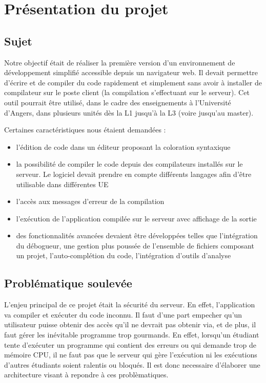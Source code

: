 \chapter{Présentation du projet}

\section{Sujet}

\par Notre objectif était de réaliser la première version d'un environnement de développement simplifié accessible depuis un navigateur web. Il devait permettre d'écrire et de compiler du code rapidement et simplement sans avoir à installer de compilateur sur le poste client (la compilation s'effectuant sur le serveur). Cet outil pourrait être utilisé, dans le cadre des enseignements à l'Université d'Angers, dans plusieurs unités dès la L1 jusqu'à la L3 (voire jusqu'au master). \\

\par Certaines caractéristiques nous étaient demandées :

\begin{itemize}

	\item l'édition de code dans un éditeur proposant la coloration syntaxique
	\item la possibilité de compiler le code depuis des compilateurs installés sur le serveur. Le logiciel devait prendre en compte différents langages afin d’être utilisable dans différentes UE
	\item l'accès aux messages d'erreur de la compilation
	\item l'exécution de l'application compilée sur le serveur avec affichage de la sortie
	\item des fonctionnalités avancées devaient être développées telles que l’intégration du débogueur, une gestion plus poussée de l’ensemble de fichiers composant un projet, l'auto-complétion du code, l'intégration d’outils d’analyse

\end{itemize}


\section{Problématique soulevée}

\par L'enjeu principal de ce projet était la sécurité du serveur. En effet, l'application va compiler et exécuter du code inconnu. Il faut d'une part empecher qu'un utilisateur puisse obtenir des accès qu'il ne devrait pas obtenir via, et de plus, il faut gérer les inévitable programme trop gourmands.  En effet, lorsqu'un étudiant tente d'exécuter un programme qui contient des erreurs ou qui demande trop de mémoire CPU, il ne faut pas que le serveur qui gère l'exécution ni les exécutions d'autres étudiants soient ralentis ou bloqués. Il est donc necessaire d'élaborer une architecture visant à repondre à ces problèmatiques.


